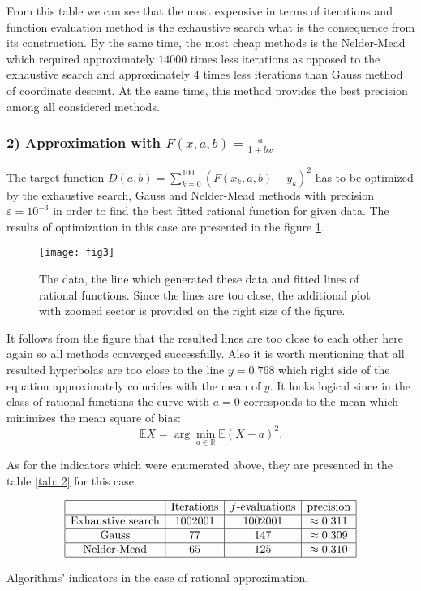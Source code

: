 \documentclass[12pt, bachelor, substylefile = algo_title.rtx]{disser}
\newcommand{\ME}{\mathbb{E}}
\newcommand{\eps}{\varepsilon}
\theoremstyle{definition}
\begin{document}
From this table we can see that the most expensive in terms of iterations and function evaluation method is the exhaustive search what is the consequence from its construction. By the same time, the most cheap methods is the Nelder-Mead which required approximately $14000$ times less iterations as opposed to the exhaustive search and approximately $4$ times less iterations than Gauss method of coordinate descent. At the same time, this method provides the best precision among all considered methods.

\subsubsection{2) Approximation with $F(x, a, b) = \frac{a}{1+bx}$}
The target function $D(a, b) = \sum_{k=0}^{100} (F(x_k,a,b)-y_k)^2$ has to be optimized by the exhaustive search, Gauss and Nelder-Mead methods with precision $\eps = 10^{-3}$ in order to find the best fitted rational function for given data. The results of optimization in this case are presented in the figure \ref{fig: 3}.

\begin{figure}[h]
\begin{center}
\texttt{[image: fig3]}
\caption{The data, the line which generated these data and fitted lines of rational functions. Since the lines are too close, the additional plot with zoomed sector is provided on the right size of the figure.}
\label{fig: 3}
\end{center}
\end{figure}

It follows from the figure that the resulted lines are too close to each other here again so all methods converged successfully. Also it is worth mentioning that all resulted hyperbolas are too close to the line $y = 0.768$ which right side of the equation approximately coincides with the mean of $y$. It looks logical since in the class of rational functions the curve with $a = 0$ corresponds to the mean which minimizes the mean square of bias:
\[ \ME X = \arg \min_{a \in \mathbb{R}} \mathbb{E}(X - a)^2. \]

As for the indicators which were enumerated above, they are presented in the table \ref{tab: 2} for this case.

\begin{table}[h]
$$
\begin{array}{|c|c|c|c|}
\hline
 & \text{Iterations} & f\text{-evaluations} & \text{precision} \\
\hline
\text{Exhaustive search} & 1002001 & 1002001 & \approx 0.311\\ 
\hline
\text{Gauss} & 77 & 147 & \approx 0.309\\
\hline
\text{Nelder-Mead} & 65 & 125 & \approx 0.310\\
\hline
\end{array}
$$
\caption{Algorithms' indicators in the case of rational approximation.}
\label{tab: 2}
\end{table}
\end{document}

